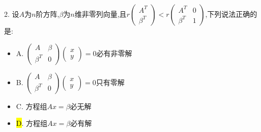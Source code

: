 2. 设$A$为$n$阶方阵,$\beta$为$n$维非零列向量,且$r\left( \begin{matrix}
	A^T\\\beta^T
\end{matrix}\right)<r\left( \begin{matrix}
A^T&0\\\beta^T&1
\end{matrix}\right)$,下列说法正确的是:  
\begin{itemize}
	\item A. $\left( \begin{matrix}
		A&\beta\\\beta^T&0
	\end{matrix}\right)\left( \begin{matrix}
	x\\y
\end{matrix}\right)=0$必有非零解
	\item B. $\left( \begin{matrix}
		A&\beta\\\beta^T&0
	\end{matrix}\right)\left( \begin{matrix}
		x\\y
	\end{matrix}\right)=0$只有零解
	\item C. 方程组$Ax=\beta$必无解
	\item \hl{D}. 方程组$Ax=\beta$必有解
\end{itemize}
